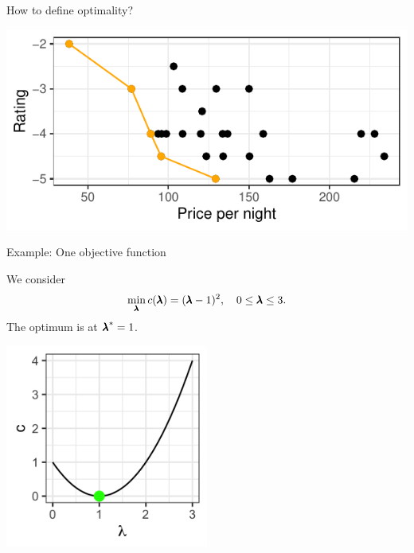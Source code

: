 \documentclass[11pt,compress,t,notes=noshow,xcolor=table]{beamer}
\begin{document}
\begin{vbframe}{How to define optimality?}
\begin{center}
\includegraphics[width=0.6\linewidth]{slides/11-multicrit/figure_man/expedia-5-1.pdf}
\end{center}

\end{vbframe}

\begin{vbframe}{Example: One objective function}

We consider 
\[
\min_{\pmb{\lambda}} c(\pmb{\lambda}) = (\pmb{\lambda} - 1)^2, 
\quad 0 \le \pmb{\lambda} \le 3.
\]
The optimum is at \({\pmb{\lambda}}^* = 1\).

\begin{center}
\includegraphics[width=0.5\textwidth]{slides/11-multicrit/figure_man/graph1.png}
\end{center}

\end{vbframe}
\end{document}
